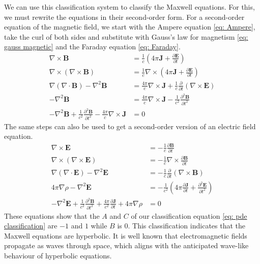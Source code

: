 We can use this classification system to classify the Maxwell equations. For this, we must rewrite the equations in their second-order form. For a second-order equation of the magnetic field, we start with the Ampere equation \ref{eq: Ampere}, take the curl of both sides and substitute with Gauss's law for magnetism \ref{eq: gauss magnetic} and the Faraday equation \ref{eq: Faraday}.
\begin{align}
    \nabla \times \mathbf{B} &= \frac{1}{c}\left(4 \pi\mathbf{J} + \frac{\partial \mathbf{E}}{\partial t}\right)\\
    \nabla \times(\nabla \times \mathbf{B}) &= \frac{1}{c} \nabla \times \left(4 \pi\mathbf{J} + \frac{\partial \mathbf{E}}{\partial t}\right)\\
    \nabla(\nabla \cdot \textbf{B}) - \nabla^2 \textbf{B} &= \frac{4 \pi}{c} \nabla \times \textbf{J} + \frac{1}{c} \frac{\partial}{\partial t} \left(\nabla \times \textbf{E}\right)\\
    - \nabla^2 \textbf{B} &= \frac{4 \pi}{c} \nabla \times \textbf{J} - \frac{1}{c^2}\frac{\partial^2\textbf{B}}{\partial t^2}\\
    - \nabla^2 \textbf{B} + \frac{1}{c^2}\frac{\partial^2\textbf{B}}{\partial t^2} - \frac{4 \pi}{c} \nabla \times \textbf{J}  &= 0
\end{align}
The same steps can also be used to get a second-order version of an electric field equation.
\begin{align}
    \nabla \times \mathbf{E} &= -\frac{1}{c}\frac{\partial \mathbf{B}}{\partial t}\\
    \nabla \times(\nabla \times \mathbf{E}) &= -\frac{1}{c} \nabla \times \frac{\partial \mathbf{B}}{\partial t}\\
    \nabla(\nabla \cdot \textbf{E}) - \nabla^2 \textbf{E} &= -\frac{1}{c} \frac{\partial}{\partial t} \left(\nabla \times \textbf{B}\right)\\
    4\pi\nabla \rho- \nabla^2 \textbf{E} &= -\frac{1}{c^2} \left(4\pi\frac{\partial \textbf{J}}{\partial t} + \frac{\partial^2\textbf{E}}{\partial t^2}\right)\\
    - \nabla^2 \textbf{E} + \frac{1}{c^2}\frac{\partial^2\textbf{B}}{\partial t^2} + \frac{4\pi}{c^2} \frac{\partial \textbf{J}}{\partial t} + 4\pi\nabla \rho &= 0
\end{align}
These equations show that the $A$ and $C$ of our classification equation \ref{eq: pde classification} are $-1$ and $1$ while $B$ is $0$. This classification indicates that the Maxwell equations are hyperbolic. It is well known that electromagnetic fields propagate as waves through space, which aligns with the anticipated wave-like behaviour of hyperbolic equations.

